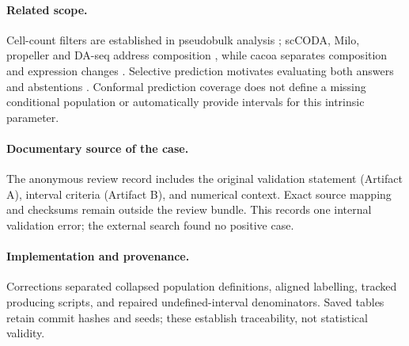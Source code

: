 \paragraph{Related scope.}\label{app:relatedwork}
Cell-count filters are established in pseudobulk analysis \citep{crowell2020};
scCODA, Milo, propeller and DA-seq address composition
\citep{buettner2021,dann2022,phipson2022,zhao2021}, while cacoa separates
composition and expression changes \citep{petukhov2022}. Selective prediction
motivates evaluating both answers and abstentions
\citep{chow1970,elyaniv2010,geifman2017}. Conformal prediction coverage
\citep{vovk2005,angelopoulos2023} does not define a missing conditional
population or automatically provide intervals for this intrinsic parameter.

\paragraph{Documentary source of the case.}\label{app:provenance}
The anonymous review record includes the original validation statement
(Artifact A), interval criteria (Artifact B), and numerical context. Exact
source mapping and checksums remain outside the review bundle. This records
one internal validation error; the external search found no positive case.

\paragraph{Implementation and provenance.}\label{app:withdrawn}
Corrections separated collapsed population definitions, aligned labelling,
tracked producing scripts, and repaired undefined-interval denominators.
Saved tables retain commit hashes and seeds; these establish traceability,
not statistical validity.
